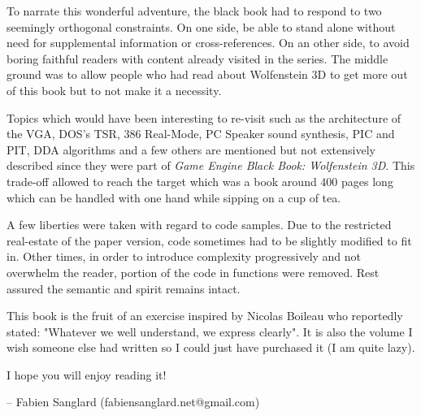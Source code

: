  To narrate this wonderful adventure, the black book had to respond to two seemingly orthogonal constraints. On one side,  be able to stand alone without need for supplemental information or cross-references. On an other side, to avoid boring faithful readers with content already visited in the series. The middle ground was to allow people who had read about Wolfenstein 3D to get more out of this book but to not make it a necessity.\\
 \par
 Topics which would have been interesting to re-visit such as the architecture of the VGA, DOS's TSR, 386 Real-Mode, PC Speaker sound synthesis, PIC and PIT, DDA algorithms and a few others are mentioned but not extensively described since they were part of \textit{Game Engine Black Book: Wolfenstein 3D}. This trade-off allowed to reach the target which was a book around 400 pages long which can be handled with one hand while sipping on a cup of tea.\\
\par
A few liberties were taken with regard to code samples. Due to the restricted real-estate of the paper version, code sometimes had to be slightly modified to fit in. Other times, in order to introduce complexity progressively and not overwhelm the reader, portion of the code in functions were removed. Rest assured the semantic and spirit remains intact.\\
\par 
This book is the fruit of an exercise inspired by Nicolas Boileau who reportedly stated: "Whatever we well understand, we express clearly". It is also the volume I wish someone else had written so I could just have purchased it (I am quite lazy).\\
\par
I hope you will enjoy reading it!\\
\par
-- Fabien Sanglard (fabiensanglard.net@gmail.com)
